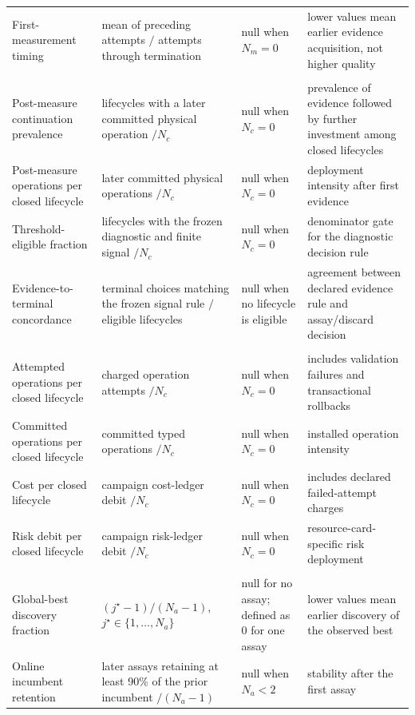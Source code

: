 \documentclass[10pt,twocolumn]{article}
\begin{document}
\begin{@twocolumnfalse}
\begin{tabularx}{\textwidth}{@{}L{0.16\textwidth}L{0.24\textwidth}L{0.20\textwidth}Y@{}}
First-measurement timing & mean of preceding attempts $/$ attempts through termination & null when $N_m=0$ & lower values mean earlier evidence acquisition, not higher quality \\
\addlinespace
{} \\
Post-measure continuation prevalence & lifecycles with a later committed physical operation $/N_c$ & null when $N_c=0$ & prevalence of evidence followed by further investment among closed lifecycles \\
Post-measure operations per closed lifecycle & later committed physical operations $/N_c$ & null when $N_c=0$ & deployment intensity after first evidence \\
Threshold-eligible fraction & lifecycles with the frozen diagnostic and finite signal $/N_c$ & null when $N_c=0$ & denominator gate for the diagnostic decision rule \\
Evidence-to-terminal concordance & terminal choices matching the frozen signal rule $/$ eligible lifecycles & null when no lifecycle is eligible & agreement between declared evidence rule and assay/discard decision \\
\addlinespace
{} \\
Attempted operations per closed lifecycle & charged operation attempts $/N_c$ & null when $N_c=0$ & includes validation failures and transactional rollbacks \\
Committed operations per closed lifecycle & committed typed operations $/N_c$ & null when $N_c=0$ & installed operation intensity \\
Cost per closed lifecycle & campaign cost-ledger debit $/N_c$ & null when $N_c=0$ & includes declared failed-attempt charges \\
Risk debit per closed lifecycle & campaign risk-ledger debit $/N_c$ & null when $N_c=0$ & resource-card-specific risk deployment \\
\addlinespace
{} \\
Global-best discovery fraction & $(j^\star-1)/(N_a-1)$, $j^\star\in\{1,\ldots,N_a\}$ & null for no assay; defined as 0 for one assay & lower values mean earlier discovery of the observed best \\
Online incumbent retention & later assays retaining at least 90\% of the prior incumbent $/(N_a-1)$ & null when $N_a<2$ & stability after the first assay \\

\end{tabularx}
\end{@twocolumnfalse}
\end{document}
